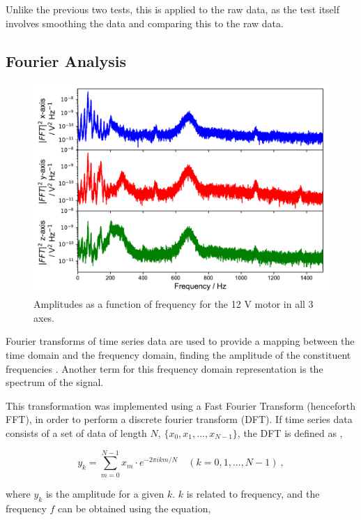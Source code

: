 Unlike the previous two tests, this is applied to the raw data, as the test itself involves smoothing the data and comparing this to the raw data.


\subsection{Fourier Analysis}

\begin{figure}[t]
    \includegraphics[width=1.0\textwidth]{fig/freq_theory.pdf}
    \caption[Fourier Spectrum of 12 V motor in $xys$ axes]{Amplitudes as a function of frequency for the 12 V motor in all 3 axes. }
    \label{fig:frequencies}
\end{figure}

Fourier transforms of time series data are used to provide a mapping between the time domain and the frequency domain, finding the amplitude of the constituent frequencies \cite{hsu_1984}. Another term for this frequency domain representation is the spectrum of the signal. 

This transformation was implemented using a Fast Fourier Transform (henceforth FFT), in order to perform a discrete fourier transform (DFT). If time series data consists of a set of data of length $N$, $\{ x_0, x_1,...,x_{N-1} \}$, the DFT is defined as \cite{hsu_1984},

\begin{equation}
    y_k = \sum_{m=0}^{N-1} x_m \cdot e^{-2\pi ikm/N} \quad (k = 0,1,...,N-1)~,
    \label{eq:DFT}
\end{equation}

where $y_k$ is the amplitude for a given $k$. $k$ is related to frequency, and the frequency $f$ can be obtained using the equation,

